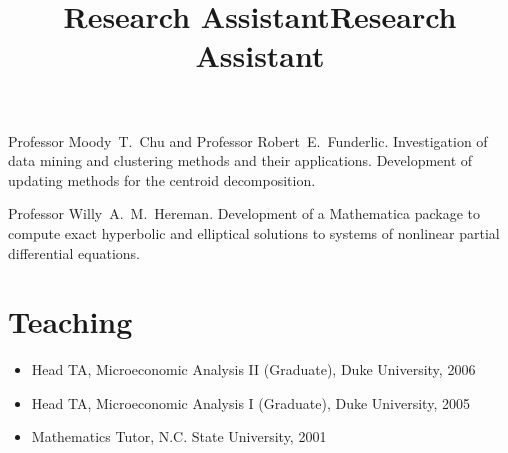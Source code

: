 \documentclass[overlapped,line,final,11pt,letterpaper]{res}
\begin{document}
\begin{resume}
\title{Research Assistant}
\begin{position}
  Professor Moody\ T.\ Chu and Professor Robert\ E.\ Funderlic.
  Investigation of data mining and clustering methods and their
  applications. Development of updating methods for the centroid
  decomposition.
\end{position}

\title{Research Assistant}
\begin{position}
  Professor Willy\ A.\ M.\ Hereman. Development of a Mathematica
  package to compute exact hyperbolic and elliptical solutions to
  systems of nonlinear partial differential equations.
\end{position}


\section{\bf Teaching}

\begin{itemize}
\item Head TA, Microeconomic Analysis II (Graduate), Duke University, 2006
\item Head TA, Microeconomic Analysis I (Graduate), Duke University, 2005
\item Mathematics Tutor, N.C. State University, 2001
\end{itemize}


%



\end{resume}
\end{document}
